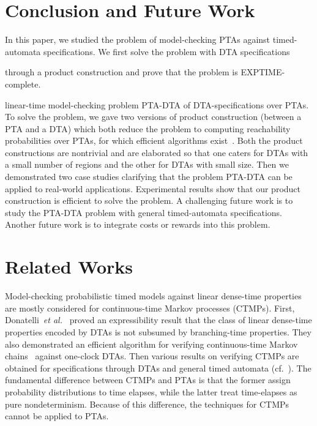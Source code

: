 \section{Conclusion and Future Work}

In this paper, we studied the problem of model-checking PTAs against timed-automata specifications. 
We first solve the problem with DTA specifications 

through a product construction and prove that the problem is 
EXPTIME-complete. 


linear-time model-checking problem {\sc PTA-DTA} of DTA-specifications over PTAs.
To solve the problem, we gave two versions of product construction (between a PTA and a DTA) which both reduce the problem to computing reachability probabilities over PTAs, for which efficient algorithms exist~\cite{DBLP:journals/fmsd/NormanPS13,DBLP:journals/tcs/KwiatkowskaNSS02}.
Both the product constructions are nontrivial and are elaborated so that one caters for DTAs with a small number of regions and the other for DTAs with small size.
Then we demonstrated two case studies clarifying that the problem PTA-DTA can be applied to real-world applications.
Experimental results show that our product construction is efficient to solve the problem.
A challenging future work is to study the PTA-DTA problem with general timed-automata specifications.
Another future work is to integrate costs or rewards into this problem.

\section{Related Works}

Model-checking probabilistic timed models against linear dense-time properties
are mostly considered for continuous-time Markov processes (CTMPs).
First, Donatelli~\emph{et al.}~\cite{DBLP:journals/tse/DonatelliHS09} proved an expressibility result that the class of linear dense-time properties encoded by DTAs is not subsumed by branching-time properties.
They also demonstrated an efficient algorithm for verifying continuous-time Markov chains~\cite{?} against one-clock DTAs.
Then various results on verifying CTMPs are obtained for specifications through DTAs and general timed automata (cf.~\cite{DBLP:journals/tse/DonatelliHS09,DBLP:journals/corr/abs-1101-3694,DBLP:conf/hybrid/Fu13,DBLP:conf/hybrid/BrazdilKKKR11,DBLP:conf/tacas/BarbotCHKM11,DBLP:conf/formats/BortolussiL15}).
The fundamental difference between CTMPs and PTAs is that the former assign probability distributions to time elapses, while the latter treat time-elapses as pure nondeterminism.
Because of this difference, the techniques for CTMPs cannot be applied to PTAs.


